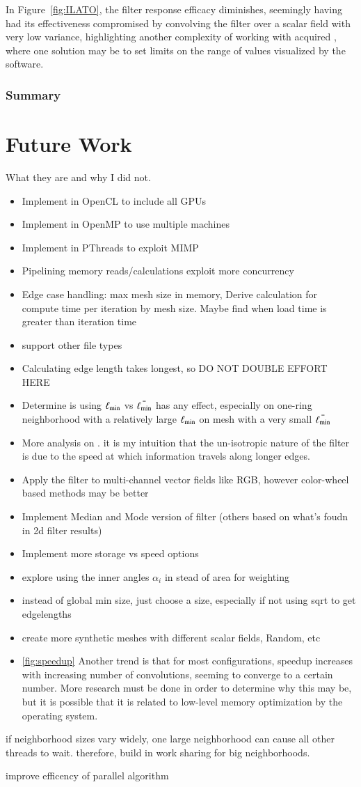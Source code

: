 In Figure~\ref{fig:ILATO}, the filter response efficacy diminishes,  seemingly having had its effectiveness compromised by convolving the filter over a scalar field with very low variance, highlighting another complexity of working with acquired \tdd{}, where one solution may be to set limits on the range of values visualized by the software.

%
%
%
%
\subsubsection{Summary}

%
%
%
%
\section{Future Work}
What they are and why I did not.
\begin{itemize}
	\item Implement in OpenCL to include all GPUs
	\item Implement in OpenMP to use multiple machines
	\item Implement in PThreads to exploit MIMP
	\item Pipelining memory reads/calculations exploit more concurrency
	\item Edge case handling: max mesh size in memory, Derive calculation for compute time per iteration by mesh size. Maybe find when load time is greater than iteration time
	\item support other file types
	\item Calculating edge length takes longest, so DO NOT DOUBLE EFFORT HERE
	\item Determine is using $\ell_\text{min}$ vs $\bar{\ell_\text{min}}$ has any effect, especially on one-ring neighborhood with a relatively large $\ell_\text{min}$ on mesh with a very small $\bar{\ell_\text{min}}$
	\item More analysis on \fors. it is my intuition that the un-isotropic nature of the filter is due to the speed at which information travels along longer edges.
	\item Apply the filter to multi-channel vector fields like RGB, however color-wheel based methods may be better
	\item Implement Median and Mode version of filter (others based on what's foudn in 2d filter results)
	\item Implement more storage vs speed options
	\item explore using the inner angles $\alpha_i$ in stead of area for weighting
	\item instead of global min size, just choose a size, especially if not using sqrt to get edgelengths
	\item create more synthetic meshes with different scalar fields, Random, etc
	\item \ref{fig:speedup} Another trend is that for most configurations, speedup increases with increasing number of convolutions, seeming to converge to a certain number. More research must be done in order to determine why this may be, but it is possible that it is related to low-level memory optimization by the operating system.
\end{itemize}
	\item if neighborhood sizes vary widely, one large neighborhood can cause all other threads to wait. therefore, build in work sharing for big neighborhoods.
	\item improve efficency of parallel algorithm

